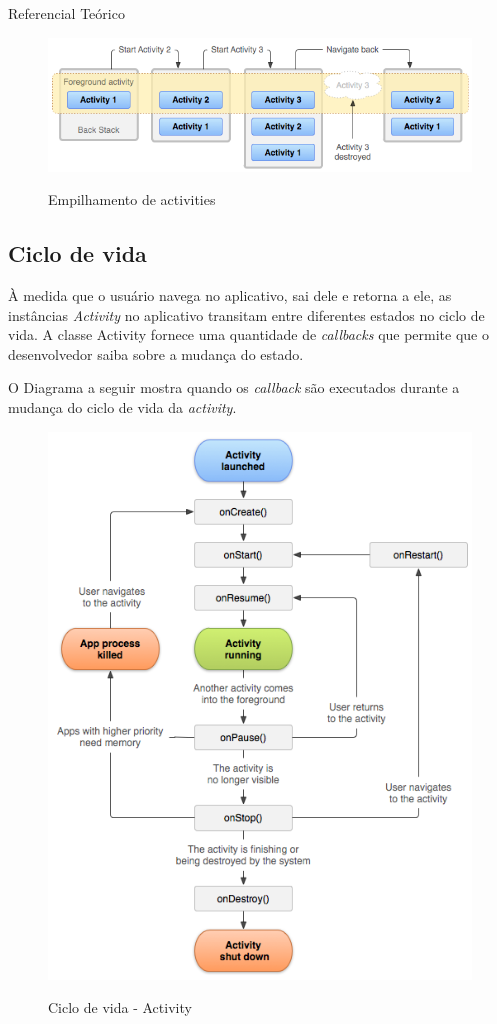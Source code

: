 \documentclass[
	12pt,				%
	openright,			%
	twoside,			%
	a4paper,			%
	english,			%
	french,				%
	spanish,			%
	brazil				%
	]{abntex2}
\begin{document}
\begin{chapter}{Referencial Teórico}
\begin{figure}[h]
\centering
   \caption{Empilhamento de activities}
   \includegraphics[scale=0.70]{media/diagram_backstack.png}
     \label{fig:backstack}
\end{figure}

\subsection{Ciclo de vida}
À medida que o usuário navega no aplicativo, sai dele e retorna a ele, as instâncias \textit{Activity} no aplicativo transitam entre diferentes estados no ciclo de vida. A classe Activity fornece uma quantidade de \textit{callbacks} que permite que o desenvolvedor saiba sobre a mudança do estado.

O Diagrama a seguir mostra quando os \textit{callback} são executados durante a mudança do ciclo de vida da \textit{activity}.
\begin{figure}[h]
\centering
   \caption{Ciclo de vida - Activity}
   \includegraphics[scale=0.70]{media/activity_lifecycle.png}
     \label{fig:lifecycle}
\end{figure}


\end{chapter}
\end{document}
